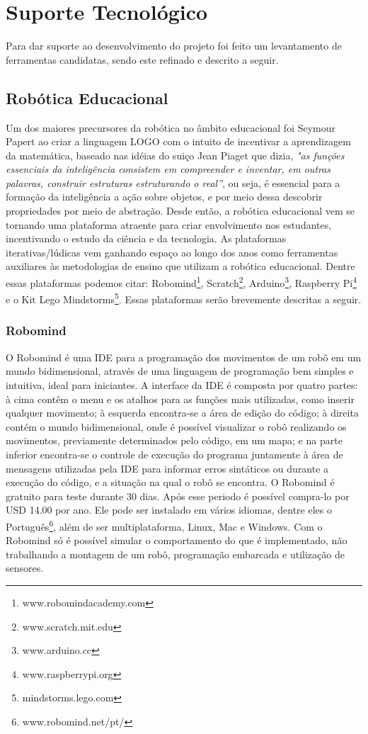 \chapter{Suporte Tecnológico}
Para dar suporte ao desenvolvimento do projeto foi feito um levantamento de ferramentas candidatas, sendo este refinado e descrito a seguir.

\section{Robótica Educacional}
Um dos maiores precursores da robótica no âmbito educacional foi Seymour Papert ao criar a  linguagem LOGO com o intuito de incentivar a aprendizagem da matemática, baseado nas idéias do suiço Jean Piaget que dizia, \textit{"as funções essenciais da inteligência consistem em compreender e inventar, em outras palavras, construir estruturas estruturando o real”}, ou seja, é essencial para a formação da inteligência a ação sobre objetos, e por meio dessa descobrir propriedades por meio de abstração.
Desde então, a robótica educacional vem se tornando uma plataforma atraente para criar envolvimento nos estudantes, incentivando o estudo da ciência e da tecnologia. 
As plataformas iterativas/lúdicas vem ganhando espaço ao longo dos anos como ferramentas auxiliares às metodologias de ensino que utilizam a robótica educacional. Dentre essas plataformas podemos citar: Robomind\footnote{www.robomindacademy.com}, Scratch\footnote{www.scratch.mit.edu}, Arduino\footnote{www.arduino.cc}, Raspberry Pi\footnote{www.raspberrypi.org} e o Kit Lego Mindstorms\footnote{mindstorms.lego.com}. Essas plataformas serão brevemente descritas a seguir.

\subsection{Robomind}
O Robomind é uma IDE para a programação dos movimentos de um robô em um mundo bidimensional, através de uma linguagem de programação bem simples e intuitiva, ideal para iniciantes. 
A interface da IDE é composta por quatro partes: à cima contêm o menu e os atalhos para as funções mais utilizadas, como inserir qualquer movimento; à esquerda encontra-se a área de  edição do código; à direita contém o mundo bidimensional, onde é possível visualizar o robô realizando os movimentos, previamente determinados pelo código, em um mapa; e na parte inferior encontra-se o controle de execução do programa juntamente à área de mensagens utilizadas pela IDE para informar erros sintáticos ou durante a execução do código, e a situação na qual o robô se encontra. 
O Robomind é gratuito para teste durante 30 dias. Após esse periodo é possível compra-lo por USD 14.00 por ano. Ele pode ser instalado em vários idiomas, dentre eles o Português\footnote{www.robomind.net/pt/}, além de ser multiplataforma, Linux, Mac e Windows. 
Com o Robomind só é possível simular o comportamento do que é implementado, não trabalhando a montagem de um robô, programação embarcada e utilização de sensores.

